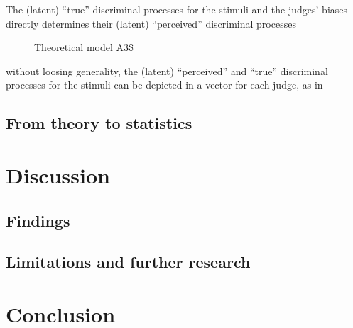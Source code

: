 \documentclass[
  authoryear,
  preprint,
  1p]{elsarticle}
\begin{document}
The (latent) ``true'' discriminal processes for the stimuli and the
judges' biases directly determines their (latent) ``perceived''
discriminal processes

\begin{figure}


\caption{\label{fig-CJ_TM_A3}Theoretical model A3\$}

\end{figure}%

without loosing generality, the (latent) ``perceived'' and ``true''
discriminal processes for the stimuli can be depicted in a vector for
each judge, as in

\subsection{From theory to statistics}\label{sec-theory-statistics}

\section{Discussion}\label{sec-discuss}

\subsection{Findings}\label{sec-discuss-finding}

\subsection{Limitations and further
research}\label{sec-discuss-limitations}

\section{Conclusion}\label{sec-conclusion}
\end{document}
